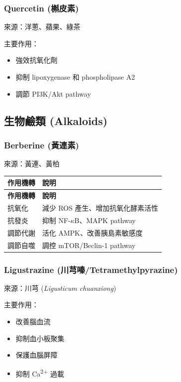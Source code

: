 \documentclass[12pt,a4paper]{article}
\begin{document}
\subsubsection{Quercetin (槲皮素)}

來源：洋蔥、蘋果、綠茶

主要作用：
\begin{itemize}
    \item 強效抗氧化劑
    \item 抑制 lipoxygenase 和 phospholipase A2
    \item 調節 PI3K/Akt pathway
\end{itemize}

\subsection{生物鹼類 (Alkaloids)}

\subsubsection{Berberine (黃連素)}

來源：黃連、黃柏

\begin{longtable}{p{4cm}p{10cm}}
\toprule
\textbf{作用機轉} & \textbf{說明} \\
\midrule
\endfirsthead
\toprule
\textbf{作用機轉} & \textbf{說明} \\
\midrule
\endhead
\bottomrule
\endfoot

抗氧化 & 減少 ROS 產生、增加抗氧化酵素活性 \\
\midrule
抗發炎 & 抑制 NF-$\kappa$B、MAPK pathway \\
\midrule
調節代謝 & 活化 AMPK、改善胰島素敏感度 \\
\midrule
調節自噬 & 調控 mTOR/Beclin-1 pathway \\
\bottomrule
\end{longtable}

\subsubsection{Ligustrazine (川芎嗪/Tetramethylpyrazine)}

來源：川芎 (\textit{Ligusticum chuanxiong})

主要作用：
\begin{itemize}
    \item 改善腦血流
    \item 抑制血小板聚集
    \item 保護血腦屏障
    \item 抑制 Ca\textsuperscript{2+} 過載
\end{itemize}
\end{document}
